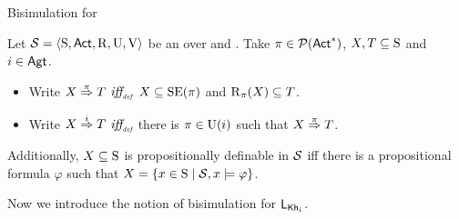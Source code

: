 \documentclass{beamer}
\begin{document}
    


\begin{frame}
    {Bisimulation for \KHilogic}

    \begin{definition}\label{def:notation}
Let $\mathcal{S}=\langle \operatorname{S},{\rm \sf Act},\operatorname{R},\operatorname{U},\operatorname{V} \rangle$ be an \ults over \PROP and \AGT. Take $\pi \in \mathcal P ({\rm \sf Act}^*)$, $X, T \subseteq \operatorname{S}$ and $i \in {\rm \sf Agt}$. \pause
\begin{itemize} \itemsep 0pt
    \item Write $X \stackrel{\pi}{\Rightarrow} T$ $\mbox{\it iff}_{\mbox{\tiny\it def}}$ $X \subseteq \operatorname{SE}(\pi)$ and $\operatorname{R}_{\pi}(X) \subseteq T$. \pause

    \item Write $X \stackrel{i}{\Rightarrow} T$ $\mbox{\it iff}_{\mbox{\tiny\it def}}$ there is $\pi \in \operatorname{U}(i)$ such that $X \stackrel{\pi}{\Rightarrow} T$. \pause
\end{itemize}
Additionally, $X \subseteq \operatorname{S}$ is propositionally definable in $\mathcal{S}$ iff there is a propositional formula $\varphi$ such that $X = \{ x \in \operatorname{S} \mid \mathcal{S}, x \models \varphi\}$.
\end{definition}

\pause
Now we introduce the notion of bisimulation for $\mathsf{L}_{\operatorname{\sf Kh}_i}$. 

\end{frame}

\end{document}

